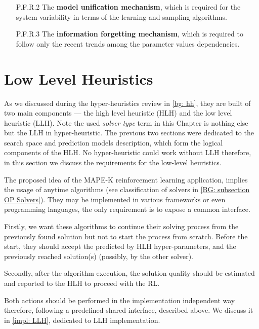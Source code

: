 \begin{itemize}
\begin{enumerate}
		\item[P.F.R.2] The \textbf{model unification mechanism}, which is required for the system variability in terms of the learning and sampling algorithms.
		
		\item[P.F.R.3] The \textbf{information forgetting mechanism}, which is required to follow only the recent trends among the parameter values dependencies.
	\end{enumerate}
\end{itemize}

\section{Low Level Heuristics}\label{concept: llh}
As we discussed during the hyper-heuristics review in \cref{bg: hh}, they are built of two main components — the high level heuristic (HLH) and the low level heuristic (LLH). Note the used \emph{solver type} term in this Chapter is nothing else but the LLH in hyper-heuristic. The previous two sections were dedicated to the search space and prediction models description, which form the logical components of the HLH. No hyper-heuristic could work without LLH therefore, in this section we discuss the requirements for the low-level heuristics.

The proposed idea of the MAPE-K reinforcement learning application, implies the usage of anytime algorithms (see classification of solvers in \cref{BG: subsection OP Solvers}).
They may be implemented in various frameworks or even programming languages, the only requirement is to expose a common interface. 

Firstly, we want these algorithms to continue their solving process from the previously found solution but not to start the process from scratch. Before the start, they should accept the predicted by HLH hyper-parameters, and the previously reached solution(s) (possibly, by the other solver). 

Secondly, after the algorithm execution, the solution quality should be estimated and reported to the HLH to proceed with the RL.

Both actions should be performed in the implementation independent way therefore, following a predefined shared interface, described above. We discuss it in \cref{impl: LLH}, dedicated to LLH implementation.


